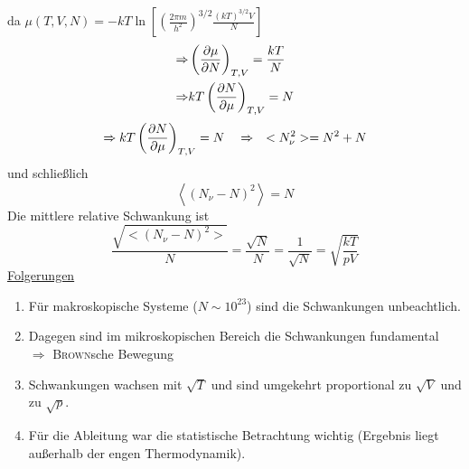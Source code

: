 da $\mu(T, V, N) = - k T \ln \left[ \left( \frac{2 \pi m}{h^2} \right)^{3/2} \frac{ \left( k T \right)^{3/2} V}{N} \right]$
\begin{equation}
    \begin{split}
        \Rightarrow & \left( \frac{\partial \mu}{\partial N} \right)_{T, V} = \frac{k T}{N} \\
        \Rightarrow & k T \left( \frac{\partial N}{\partial \mu} \right)_{T, V} = N
    \end{split}
\end{equation}
\begin{equation}
    \Rightarrow k T \left( \frac{\partial N}{\partial \mu} \right)_{T, V} = N \quad \Rightarrow \quad <N_\nu^2> = N^2 + N
\end{equation}
und schließlich
\begin{equation}
    \left\langle(N_\nu - N)^2\right\rangle = N  %
\end{equation}
Die mittlere relative Schwankung ist
\begin{equation}
    \frac{\sqrt{<(N_\nu - N)^2>}}{N} = \frac{\sqrt{N}}{N} = \frac{1}{\sqrt{N}} = \sqrt{\frac{k T}{p V}}
\end{equation}
\underline{Folgerungen}
\begin{enumerate}
    \item Für makroskopische Systeme ($N \sim 10^{23}$) sind die Schwankungen unbeachtlich.
    \item Dagegen sind im mikroskopischen Bereich die Schwankungen fundamental \\
    $\Rightarrow$ \textsc{Brown}sche Bewegung
    \item Schwankungen wachsen mit $\sqrt{T}$ und sind umgekehrt proportional zu $\sqrt{V}$ und zu $\sqrt{p}$.
    \item Für die Ableitung war die statistische Betrachtung wichtig (Ergebnis liegt außerhalb der engen Thermodynamik).
\end{enumerate}
